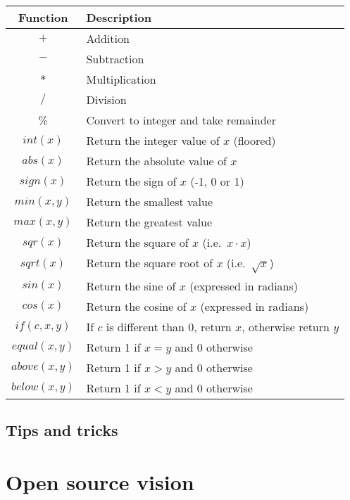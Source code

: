 \documentclass[11pt, a5paper, pagesize]{scrbook}
\begin{document}
\begin{tabularx}{\textwidth}{|c|X|}
\hline
\textbf{Function} & \textbf{Description} \\
\hline
$+$ & Addition \\
\hline
$-$ & Subtraction \\
\hline
$*$ & Multiplication \\
\hline
$/$ & Division \\
\hline
\% & Convert to integer and take remainder\\
\hline
$int(x)$ & Return the integer value of $x$ (floored) \\
\hline
$abs(x)$ & Return the absolute value of $x$ \\
\hline
$sign(x)$ & Return the sign of $x$ (-1, 0 or 1) \\
\hline
$min(x,y)$ & Return the smallest value \\
\hline
$max(x,y)$ & Return the greatest value \\
\hline
$sqr(x)$ & Return the square of $x$ (i.e.\ $x \cdot x$) \\
\hline
$sqrt(x)$ & Return the square root of $x$ (i.e.\ $\sqrt{x}$) \\
\hline
$sin(x)$ & Return the sine of $x$ (expressed in radians) \\
\hline
$cos(x)$ & Return the cosine of $x$ (expressed in radians) \\
\hline
$if(c,x,y)$ & If $c$ is different than 0, return $x$, otherwise return $y$ \\
\hline
$equal(x,y)$ & Return 1 if $x = y$ and 0 otherwise \\
\hline
$above(x,y)$ & Return 1 if $x > y$ and 0 otherwise \\
\hline
$below(x,y)$ & Return 1 if $x < y$ and 0 otherwise \\
\hline
\end{tabularx}

\section{Tips and tricks}

\chapter{Open source vision}
\end{document}
